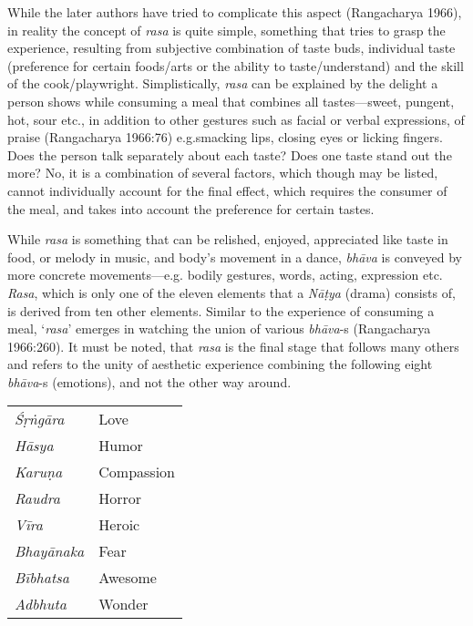 While the later authors have tried to complicate this aspect (Rangacharya 1966), in reality the concept of \textsl{rasa} is quite simple, something that tries to grasp the experience, resulting from subjective combination of taste buds, individual taste (preference for certain foods/arts or the ability to taste/understand) and the skill of the cook/playwright. Simplistically, \textsl{rasa} can be explained by the delight a person shows while consuming a meal that combines all tastes---sweet, pungent, hot, sour etc., in addition to other gestures such as facial or verbal expressions, of praise (Rangacharya 1966:76) e.g.\@ smacking lips, closing eyes or licking fingers. Does the person talk separately about each taste? Does one taste stand out the more? No, it is a combination of several factors, which though may be listed, cannot individually account for the final effect, which requires the consumer of the meal, and takes into account the preference for certain tastes. 

While \textsl{rasa} is something that can be relished, enjoyed, appreciated like taste in food, or melody in music, and body’s movement in a dance, \textsl{bhāva} is conveyed by more concrete movements---e.g. bodily gestures, words, acting, expression etc. \textsl{Rasa}, which is only one of the eleven elements that a \textsl{Nāṭya} (drama) consists of, is derived from ten other elements. Similar to the experience of consuming a meal, ‘\textsl{rasa}’ emerges in watching the union of various \textsl{bhāva}-s (Rangacharya 1966:260). It must be noted, that \textsl{rasa} is the final stage that follows many others and refers to the unity of aesthetic experience combining the following eight \textsl{bhāva}-s (emotions), and not the other way around. 
\begin{center}
\begin{tabular}{|l|l|}
\hline
\textsl{Śṛṅgāra} & Love\\
\textsl{Hāsya}\index{hasya@\textsl{hāsya}}\index{rasa@\textsl{rasa}!hasya@\textsl{hāsya}} & Humor\\
\textsl{Karuṇa}\index{karuna@\textsl{karuṇa}}\index{rasa@\textsl{rasa}!karuna@\textsl{karuṇa}} & Compassion\\
\textsl{Raudra} & Horror\\
\textsl{Vīra} & Heroic\\
\textsl{Bhayānaka}\index{bhayanaka@\textsl{bhayānaka}}\index{rasa@\textsl{rasa}!bhayanaka@\textsl{bhayānaka}} & Fear\\
\textsl{Bībhatsa}\index{bibhatsa@\textsl{bībhatsa}}\index{rasa@\textsl{rasa}!bibhatsa@\textsl{bībhatsa}} & Awesome\\
\textsl{Adbhuta} & Wonder\\
\hline
\end{tabular}
\end{center}

